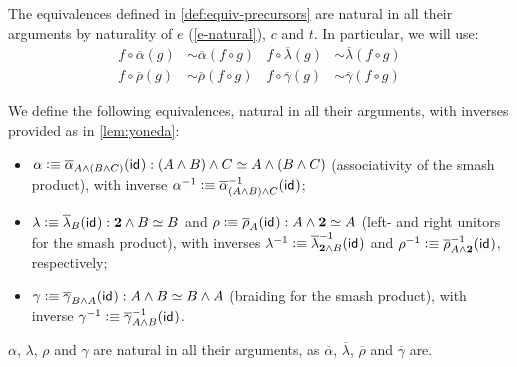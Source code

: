 \documentclass{article}
\renewcommand{\smash}{\wedge}
\renewcommand{\o}{\ensuremath{\circ}}
\newcommand{\sy}{^{-1}}
\newcommand{\alphabar}{\overline{\alpha}}
\newcommand{\rhobar}{\overline{\rho}}
\newcommand{\lambdabar}{\overline{\lambda}}
\newcommand{\gammabar}{\overline{\gamma}}
\newcommand{\two}{\mathbf{2}}
\begin{document}
\begin{rmk}
	The equivalences defined in \autoref{def:equiv-precursors} are natural in all their arguments by naturality of $e$ (\autoref{e-natural}), $c$ and $t$. In particular, we will use:
	\begin{align*}
	f \o \alphabar(g) &\sim \alphabar(f \o g) & f \o \lambdabar(g) &\sim \lambdabar(f \o g)\\
	f \o \rhobar(g) &\sim \rhobar(f \o g) & f \o \gammabar(g) &\sim \gammabar(f \o g)
	\end{align*}
\end{rmk}

\begin{defn}\label{def:smash-alrg}
	We define the following equivalences, natural in all their arguments, with inverses provided as in \autoref{lem:yoneda}:
	\begin{itemize}
		\item $\alpha\defeq\alphabar_{A \smash (B \smash C)}(\idfunc) : (A \smash B) \smash C \simeq A \smash (B \smash C)$ (associativity of the smash product), with inverse $\alpha\sy\defeq\alphabar\sy_{(A \smash B) \smash C}(\idfunc)$;
		\item $\lambda \defeq \lambdabar_B(\idfunc) : \two \smash B \simeq B$ and $\rho \defeq \rhobar_A(\idfunc) : A \smash \two \simeq A$ (left- and right unitors for the smash product), with inverses $\lambda\sy\defeq \lambdabar_{\two\smash B}\sy(\idfunc)$ and $\rho\sy\defeq \rhobar_{A\smash \two}\sy(\idfunc)$, respectively;
		\item $\gamma \defeq \gammabar_{B\smash A} (\idfunc) : A \smash B \simeq B \smash A$ (braiding for the smash product), with inverse $\gamma\sy \defeq \gammabar_{A \smash B}\sy (\idfunc)$.
	\end{itemize}
	$\alpha$, $\lambda$, $\rho$ and $\gamma$ are natural in all their arguments, as $\alphabar$, $\lambdabar$, $\rhobar$ and $\gammabar$ are.
\end{defn}
\end{document}
